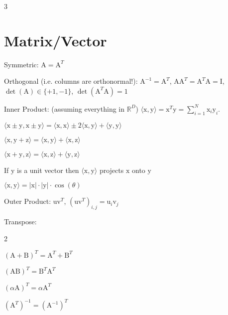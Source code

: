 \documentclass[a4paper, 11pt, landscape]{article}
\newenvironment{listcols}[1]
	{%
		\bgroup %
		\setlength{\multicolsep}{0pt} %
		\begin{multicols*}{#1} %
	}
	{%
		\end{multicols*} %
		\egroup %
	}
\newcommand{\matr}[1]{\boldsymbol{\mathrm{#1}}}
\begin{document}
\begin{multicols*}{3}
\section{Matrix/Vector}
\begin{compactdesc}
	\item[Symmetric:] $\matr{A} = \matr{A}^T$
	\item[Orthogonal (i.e. columns are orthonormal!):] $\matr{A}^{-1} = \matr{A}^T$, $\matr{A} \matr{A}^T = \matr{A}^T \matr{A} = \matr{I}$, $\operatorname{det}(\matr{A}) \in \{+1, -1\}$, $\operatorname{det}(\matr{A}^T \matr{A}) = 1$
	\item[Inner Product:] (assuming everything in $\mathbb{R}^D$) $\langle \matr{x}, \matr{y} \rangle = \matr{x}^T \matr{y} = \sum_{i=1}^{N} \matr{x}_i \matr{y}_i$.
	\begin{compactitem}
		\item $\langle \matr{x} \pm \matr{y}, \matr{x} \pm \matr{y} \rangle = \langle \matr{x}, \matr{x} \rangle \pm 2 \langle \matr{x}, \matr{y} \rangle + \langle \matr{y}, \matr{y} \rangle$
		\item $\langle \matr{x}, \matr{y} + \matr{z} \rangle = \langle \matr{x}, \matr{y} \rangle + \langle \matr{x}, \matr{z} \rangle$
		\item $\langle \matr{x} + \matr{y}, \matr{z} \rangle = \langle \matr{x}, \matr{z} \rangle + \langle \matr{y}, \matr{z} \rangle$
		\item If $\matr{y}$ is a unit vector then $\langle \matr{x}, \matr{y} \rangle$ projects $\matr{x}$ onto $\matr{y}$
		\item $\langle \matr{x}, \matr{y} \rangle = |\matr{x}| \cdot |\matr{y}| \cdot \cos(\theta)$
	\end{compactitem}
	\item[Outer Product:] $\matr{u} \matr{v}^T$, $(\matr{u} \matr{v}^T)_{i, j} = \matr{u}_i \matr{v}_j$
	\item[Transpose:]\hfill
	\begin{listcols}{2}
		\begin{compactitem}
			\item $(\matr{A} + \matr{B})^T = \matr{A}^T + \matr{B}^T$
			\item $(\matr{A}\matr{B})^T = \matr{B}^T \matr{A}^T$
			\item $(\alpha \matr{A})^T = \alpha \matr{A}^T$
			\item $(\matr{A}^T)^{-1} = (\matr{A}^{-1})^T$
		\end{compactitem}
	\end{listcols}
\end{compactdesc}


\end{multicols*}
\end{document}
